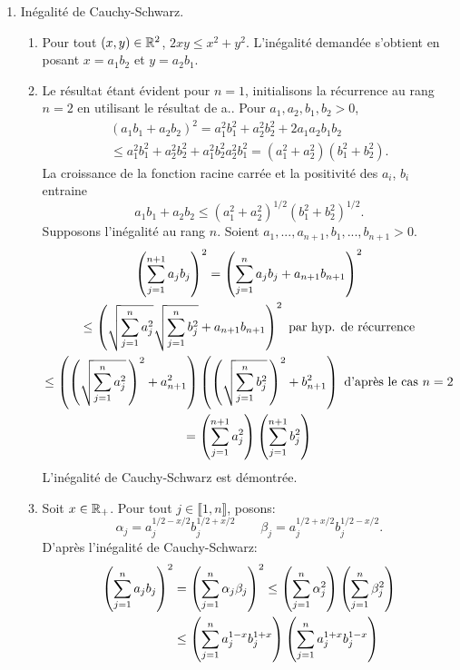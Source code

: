 \begin{enumerate}
 \item Inégalité de Cauchy-Schwarz.
    \begin{enumerate}
       \item Pour tout $(x, y)\in \mathbb{R}^{2}$, $2xy \leq x^{2} + y^{2}$. L'inégalité demandée s'obtient en posant $x = a_{1}b_{2}$ et $y = a_{2}b_{1}$.
       \item Le résultat étant évident pour $n=1$, initialisons la récurrence au rang $n=2$ en utilisant le résultat de a.. Pour $a_{1}, a_{2}, b_{1}, b_{2} > 0$, 
         \begin{multline*}
          (a_{1}b_{1} + a_{2}b_{2})^{2}  = a_{1}^{2}b_{1}^{2} + a_{2}^{2}b_{2}^{2} + 2a_{1}a_{2}b_{1}b_{2}  \\
           \leq a_{1}^{2}b_{1}^{2} + a_{2}^{2}b_{2}^{2} + a_{1}^{2}b_{2}^{2}a_{2}^{2}b_{1}^{2} 
           = (a_{1}^{2}+a_{2}^{2})(b_{1}^{2} + b_{2}^{2}).
         \end{multline*}
    La croissance de la fonction racine carrée et la positivité des $a_{i}$, $b_{i}$ entraine 
    \[
    a_{1}b_{1} + a_{2}b_{2} \leq (a_{1}^{2} + a_{2}^{2})^{1/2}(b_{1}^{2}+b_{2}^{2})^{1/2}.
     \]  
    Supposons l'inégalité au rang $n$. Soient $a_{1}, ..., a_{n+1}, b_{1}, ..., b_{n+1} > 0$. 
    \begin{multline*}
     \left( \sum_{j=1}^{n+1}a_{j}b_{j}\right)^2   = \left( \sum_{j=1}^{n}a_{j}b_{j} + a_{n+1}b_{n+1}\right)^2\\  
      \leq \left( \sqrt{\sum_{j=1}^{n}a_{j}^{2}} \sqrt{ \sum_{j=1}^{n}b_{j}^{2}} + a_{n+1}b_{n+1}\right)^2  \text{ par hyp. de récurrence}\\
      \leq \left ( \left( \sqrt{\sum_{j=1}^{n}a_{j}^{2}}\,\right) ^{2} + a_{n+1}^{2} \right )
           \left ( \left( \sqrt{\sum_{j=1}^{n}b_{j}^{2}}\,\right) ^{2} + b_{n+1}^{2}\right )
      \text{ d'après le cas } n=2 \notag\\
      = \left ( \sum_{j=1}^{n+1}a_{j}^{2}\right ) \left ( \sum_{j=1}^{n+1}b_{j}^{2}\right )
    \end{multline*}
    L'inégalité de Cauchy-Schwarz est démontrée.
    
    \item Soit $x\in \mathbb{R}_{+}$. Pour tout $j\in \llbracket 1, n\rrbracket$, posons:
    \[ \alpha_{j} = a_{j}^{1/2 - x/2}b_{j}^{1/2 + x/2} \qquad \beta_{j} = a_{j}^{1/2 + x/2}b_{j}^{1/2 - x/2}.\]
    D'après l'inégalité de Cauchy-Schwarz:
    \begin{align}
     \left ( \sum_{j=1}^{n}a_{j}b_{j} \right )^{2} & = \left ( \sum_{j=1}^{n}\alpha_{j}\beta_{j}\right )^{2} \leq \left ( \sum_{j=1}^{n}\alpha_{j}^{2}\right ) \left ( \sum_{j=1}^{n}\beta_{j}^{2}\right )\notag \\
    & \leq \left ( \sum_{j=1}^{n}a_{j}^{1-x}b_{j}^{1+x}\right ) \left ( \sum_{j=1}^{n}a_{j}^{1+x}b_{j}^{1-x}\right )\notag
    \end{align}
  \end{enumerate}
       

\end{enumerate}
